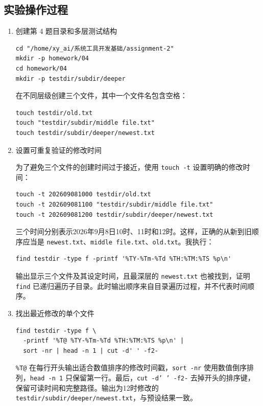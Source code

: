 \documentclass[a4paper,12pt]{report}
\begin{document}
\subsection{实验操作过程}
\begin{enumerate}
  \item {\large 创建第 4 题目录和多层测试结构}



\begin{lstlisting}
cd "/home/xy_ai/系统工具开发基础/assignment-2"
mkdir -p homework/04
cd homework/04
mkdir -p testdir/subdir/deeper
\end{lstlisting}

  在不同层级创建三个文件，其中一个文件名包含空格：

\begin{lstlisting}
touch testdir/old.txt
touch "testdir/subdir/middle file.txt"
touch testdir/subdir/deeper/newest.txt
\end{lstlisting}

  \item {\large 设置可重复验证的修改时间}

  为了避免三个文件的创建时间过于接近，使用 \texttt{touch -t} 设置明确的修改时间：

\begin{lstlisting}
touch -t 202609081000 testdir/old.txt
touch -t 202609081100 "testdir/subdir/middle file.txt"
touch -t 202609081200 testdir/subdir/deeper/newest.txt
\end{lstlisting}

  三个时间分别表示2026年9月8日10时、11时和12时。这样，正确的从新到旧顺序应当是 \texttt{newest.txt}、\texttt{middle file.txt}、\texttt{old.txt}。我执行：

\begin{lstlisting}
find testdir -type f -printf '%TY-%Tm-%Td %TH:%TM:%TS %p\n'
\end{lstlisting}

  输出显示三个文件及其设定时间，且最深层的 \texttt{newest.txt} 也被找到，证明 \texttt{find} 已递归遍历子目录。此时输出顺序来自目录遍历过程，并不代表时间顺序。

  \item {\large 找出最近修改的单个文件}

\begin{lstlisting}
find testdir -type f \
  -printf '%T@ %TY-%Tm-%Td %TH:%TM:%TS %p\n' |
  sort -nr | head -n 1 | cut -d' ' -f2-
\end{lstlisting}

  \texttt{\%T@} 在每行开头输出适合数值排序的修改时间戳，\texttt{sort -nr} 使用数值倒序排列，\texttt{head -n 1} 只保留第一行。最后，\texttt{cut -d' ' -f2-} 去掉开头的排序键，保留可读时间和完整路径。输出为12时修改的 \texttt{testdir/subdir/deeper/newest.txt}，与预设结果一致。


\end{enumerate}
\end{document}
